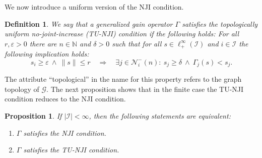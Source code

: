\documentclass[10pt, oneside, a4paper]{article}
\newcommand{\N}{\mathbb{N}}
\newcommand{\ep}{\varepsilon}
\newcommand{\GC}{\mathcal{G}}
\newcommand{\IC}{\mathcal{I}}
\newcommand{\NC}{\mathcal{N}}
\newtheorem{proposition}{Proposition}[section]
\newtheorem{definition}{Definition}[section]
\begin{document}
We now introduce a uniform version of the NJI condition.%

\begin{definition}
We say that a generalized gain operator $\Gamma$ satisfies the \emph{topologically uniform no-joint-increase (TU-NJI) condition} if the following holds: For all $r,\ep > 0$ there are $n \in \N$ and $\delta > 0$ such that for all $s \in \ell^{\infty}_+(\IC)$ and $i \in \IC$ the following implication holds:%
\begin{equation*}
  s_i \geq \ep  \ \wedge \ \|s\| \leq r  \quad \Rightarrow \quad \exists j \in \NC^-_i(n):\ s_j \geq \delta \ \wedge \ \Gamma_j(s) < s_j.%
\end{equation*}
\end{definition}

The attribute ``topological'' in the name for this property refers to the graph topology of $\GC$. The next proposition shows that in the finite case the TU-NJI condition reduces to the NJI condition.%

\begin{proposition}\label{prop_finite_case_uniform_NJI}
If $|\IC| < \infty$, then the following statements are equivalent:%
\begin{enumerate}
\item[(a)] $\Gamma$ satisfies the NJI condition.%
\item[(b)] $\Gamma$ satisfies the TU-NJI condition.%
\end{enumerate}
\end{proposition}
\end{document}
